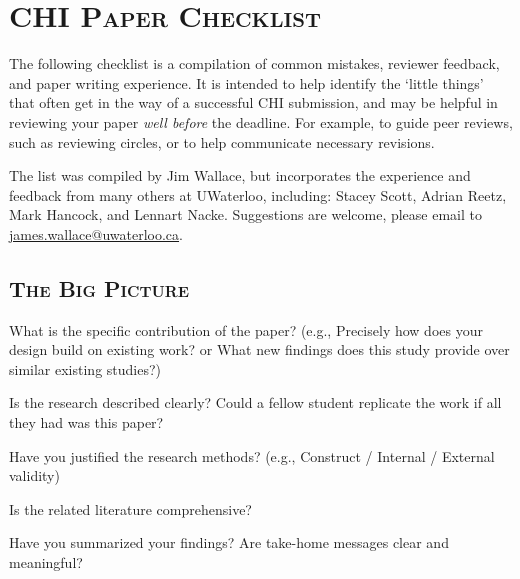 \documentclass[12pt]{article} %
\begin{document}
\pagestyle{fancy}
\renewcommand{\headrulewidth}{0pt}

\newenvironment{checklist}{%
  \begin{list}{}{}%
  \let\olditem\item
  \renewcommand\item{\olditem[$\Box$] }
}{%
  \end{list}
}


\section*{\textsc{CHI Paper Checklist}}
The following checklist is a compilation of common mistakes, reviewer feedback, and paper writing experience. It is intended to help identify the `little things' that often get in the way of a successful CHI submission, and may be helpful in reviewing your paper \textit{well before} the deadline. For example, to guide peer reviews, such as reviewing circles, or to help communicate necessary revisions. 

The list was compiled by Jim Wallace, but incorporates the experience and feedback from many others at UWaterloo, including: Stacey Scott, Adrian Reetz, Mark Hancock, and Lennart Nacke. Suggestions are welcome, please email to \href{mailto:james.wallace@uwaterloo.ca}{james.wallace@uwaterloo.ca}. 

\noindent\makebox[\linewidth]{\rule{\linewidth}{0.4pt}}
\subsection*{\textsc{The Big Picture}}
\vspace{0.5cm}
\begin{checklist}
	\item What is the specific contribution of the paper? (e.g., Precisely how does your design build on existing work? or What new findings does this study provide over similar existing studies?)
	\item Is the research described clearly? Could a fellow student replicate the work if all they had was this paper?  
	\item Have you justified the research methods? (e.g., Construct / Internal / External validity)
	\item Is the related literature comprehensive? 
	\item Have you summarized your findings? Are take-home messages clear and meaningful? 
\end{checklist}
\end{document}
